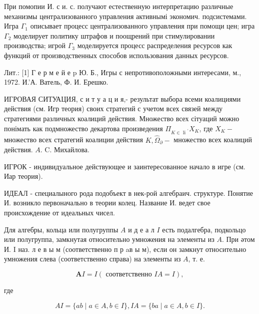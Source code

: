 \documentclass[10pt]{article}
\begin{document}
При помопии И. с и. с. получают естественную интерпретацию различные механизмы централизованного управления активнымі экономич. подсистемами. Игра $\Gamma_{1}$ описывает процесс централизованного управления при помощи цен; игра $\Gamma_{2}$ моделирует политику штрафов и поощрений при стимулировании производства; игрой $\Gamma_{3}$ моделируется процесс распределения ресурсов как функций от производственных способов использования данных ресурсов.



Лит.: [1] Г е р м е й е p Ю. Б., Игры с непротивоположными интересами, м., 1972. И.'А. Ватель, Ф. И. Ерешко.



ИГРОВАЯ СИТУАЦИЯ, с и т у а ц и я,- результат выбора всеми коалициями действия (см. Игр теория) своих стратегий с учетом всех связей между стратегиями различных коалиций действия. Множество всех сітуаций можно понімать как подмножество декартова произведения $\Pi_{K \in \text { li }^{\prime}} X_{K}$, где $X_{K}-$ множество всех стратегий коалиции действия $K, \widehat{\Omega}_{\partial}-$ множество всех коалиций действия. $A$. C. Михайлова.



ИГРОК - индивидуальное действующее и заинтересованное начало в игре (см. Иар теория).



ИДЕАЛ - специалыного рода подобъект в нек-рой алгебраич. структуре. Понятие И. возникло первоначально в теории колец. Название И. ведет свое происхождение от идеальных чисел.



Для алгебры, кольца или полугруппы $A$ и д е а л $I$ есть подалгебра, подкольцо или полугруппа, замкнутая относительно умножения на элементы из $A$. При әтом И. I наз. л е в ы м (соответственно п р aв ы м), если он замкнут относительно умножения слева (соответственно справа) на элементы из $A$, т. е.



\[

\boldsymbol{A} I=I(\text { соответственно } I A=I),

\]



где



\[

A I=\{a b \mid a \in A, b \in I\}, I A=\{b a \mid a \in A, b \in I\} .

\]
\end{document}
